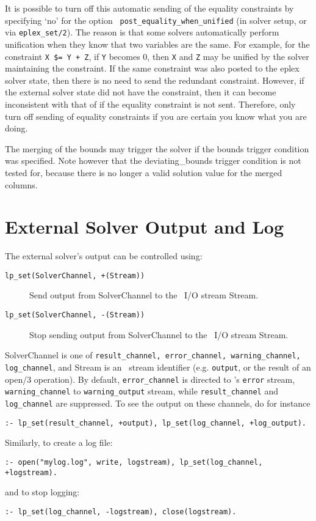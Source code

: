 It is possible to turn off this automatic sending of the equality
constraints by specifying `no' for the option {\tt
post_equality_when_unified} (in solver setup, or via \verb'eplex_set/2'). 
The reason is that some solvers automatically perform unification
when they know that two variables are the same. For example, for
the constraint {\tt X \$= Y + Z}, if {\tt Y} becomes 0, then {\tt X} and
{\tt Z} may be unified by the solver maintaining the constraint. If the
same constraint was also posted to the eplex solver state, then there is no
need to send the redundant constraint. However, if the external solver
state did not have the constraint, then it can become inconsistent with
that of {\eclipse} if the equality constraint is not sent. Therefore, only
turn off sending of equality constraints if you are certain you know what
you are doing.

The merging of the bounds may trigger the solver if the bounds trigger
condition was specified. Note however that the deviating_bounds trigger
condition is not tested for, because there is no longer a valid solution
value for the merged columns. 

\section{External Solver Output and Log}
The external solver's output can be controlled using:
\begin{description}
\item[{\tt lp_set(SolverChannel, +(Stream))}]
Send output from SolverChannel to the \eclipse\ I/O stream Stream.
\item[{\tt lp_set(SolverChannel, -(Stream))}]
Stop sending output from SolverChannel to the \eclipse\ I/O stream Stream.
\end{description}
SolverChannel is one of
{\tt result_channel, error_channel, warning_channel, log_channel},
and Stream is an \eclipse\ stream identifier (e.g. {\tt output},
or the result of an open/3 operation).
By default, {\tt error_channel} is directed to \eclipse's {\tt error} stream,
{\tt warning_channel} to {\tt warning_output} stream,
while {\tt result_channel} and {\tt log_channel} are suppressed.
To see the output on these channels, do for instance
\begin{verbatim}
:- lp_set(result_channel, +output), lp_set(log_channel, +log_output).
\end{verbatim}
Similarly, to create a log file:
\begin{verbatim}
:- open("mylog.log", write, logstream), lp_set(log_channel, +logstream).
\end{verbatim}
and to stop logging:
\begin{verbatim}
:- lp_set(log_channel, -logstream), close(logstream).
\end{verbatim}


